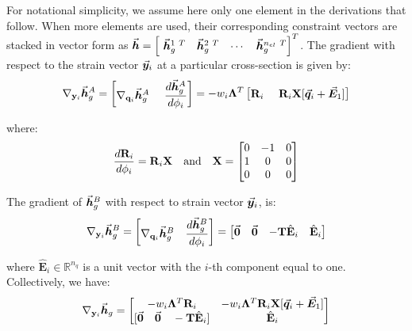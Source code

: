 \begin{appendices}
\noindent For notational simplicity, we assume here only one element
in the derivations that follow. When more elements are used, their
corresponding constraint vectors are stacked in vector form as
$\vec{\bm{h}} = \begin{bmatrix}
	\ \vec{\bm{h}}_g^{1\ T}& \vec{\bm{h}}_g^{2\ T}& \cdots & \vec{\bm{h}}_g^{n_{el}\ T}
\end{bmatrix}^T$.
The gradient with respect to the strain vector
$\vec{\bm{y}}_i$ at a particular cross-section is given by:
\begin{gather}
	\nabla_{\mathbf{y}_i}\vec{\bm{h}}_g^A = \begin{bmatrix}
		\nabla_{\mathbf{q}_i}\vec{\bm{h}}_g^A &\ \dfrac{d \vec{\bm{h}}_g^A}{d\phi_i}
	\end{bmatrix} = -w_i\mathbf{\Lambda}^T\begin{bmatrix}
		\mathbf{R}_i &\
		\mathbf{R}_i\mathbf{X}[\vec{\bm{q}}_i+\vec{\bm{E}}_1]
	\end{bmatrix}\nonumber
\end{gather}

\noindent where:
\begin{gather}
	\frac{d\mathbf{R}_i}{d\phi_i} = \mathbf{R}_i\mathbf{X}\quad\text{and}\quad
	\mathbf{X} = \begin{bmatrix}
		0 & -1 & 0\\
		1 &  0 & 0\\
		0 &  0 & 0
	\end{bmatrix}\nonumber
\end{gather}

\noindent The gradient of $\vec{\bm{h}}_g^B$ with respect to strain vector
$\vec{\bm{y}}_i$, is:
\begin{gather}
	\nabla_{\mathbf{y}_i}\vec{\bm{h}}_g^B = \begin{bmatrix}
		\nabla_{\mathbf{q}_i}\vec{\bm{h}}_g^B & \dfrac{d \vec{\bm{h}}_g^B}{d\phi_i}
	\end{bmatrix} = \begin{bmatrix}
		\vec{\bm{0}} & \vec{\bm{0}} & -\mathbf{T}\hat{\mathbf{E}}_i & \hat{\mathbf{E}}_i
	\end{bmatrix}
	\label{eq:grad_Hb_y}
\end{gather}

\noindent where $\hat{\mathbf{E}}_i\in\mathbb{R}^{n_q}$ is a unit vector with 
the
$i$-th component equal to one.
\noindent Collectively, we have:
\begin{gather}
	\nabla_{\mathbf{y}_i}\bvec{h}_g = \begin{bmatrix}
		-w_i\bmat{\Lambda}^T\bmat{R}_i & -w_i\bmat{\Lambda}^T
		\bmat{R}_i\bmat{X}[\bvec{q}_i+\bvec{E}_1]\\
		[\bvec{0}\quad \bvec{0}\quad -\bmat{T}\hat{\mathbf{E}}_i] & 
		\hat{\mathbf{E}}_i
	\end{bmatrix}
	\label{eq:con1}
\end{gather}


\end{appendices}
